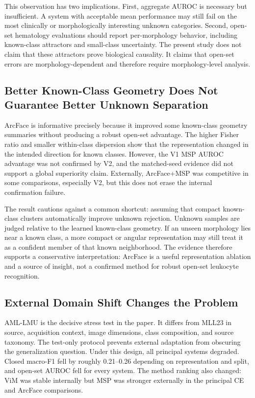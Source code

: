 This observation has two implications. First, aggregate AUROC is necessary but insufficient. A system with acceptable mean performance may still fail on the most clinically or morphologically interesting unknown categories. Second, open-set hematology evaluations should report per-morphology behavior, including known-class attractors and small-class uncertainty. The present study does not claim that these attractors prove biological causality. It claims that open-set errors are morphology-dependent and therefore require morphology-level analysis.

\subsection{Better Known-Class Geometry Does Not Guarantee Better Unknown Separation}

ArcFace is informative precisely because it improved some known-class geometry summaries without producing a robust open-set advantage. The higher Fisher ratio and smaller within-class dispersion show that the representation changed in the intended direction for known classes. However, the V1 MSP AUROC advantage was not confirmed by V2, and the matched-seed evidence did not support a global superiority claim. Externally, ArcFace+MSP was competitive in some comparisons, especially V2, but this does not erase the internal confirmation failure.

The result cautions against a common shortcut: assuming that compact known-class clusters automatically improve unknown rejection. Unknown samples are judged relative to the learned known-class geometry. If an unseen morphology lies near a known class, a more compact or angular representation may still treat it as a confident member of that known neighborhood. The evidence therefore supports a conservative interpretation: ArcFace is a useful representation ablation and a source of insight, not a confirmed method for robust open-set leukocyte recognition.

\subsection{External Domain Shift Changes the Problem}

AML-LMU is the decisive stress test in the paper. It differs from MLL23 in source, acquisition context, image dimensions, class composition, and source taxonomy. The test-only protocol prevents external adaptation from obscuring the generalization question. Under this design, all principal systems degraded. Closed macro-F1 fell by roughly 0.21--0.26 depending on representation and split, and open-set AUROC fell for every system. The method ranking also changed: ViM was stable internally but MSP was stronger externally in the principal CE and ArcFace comparisons.

